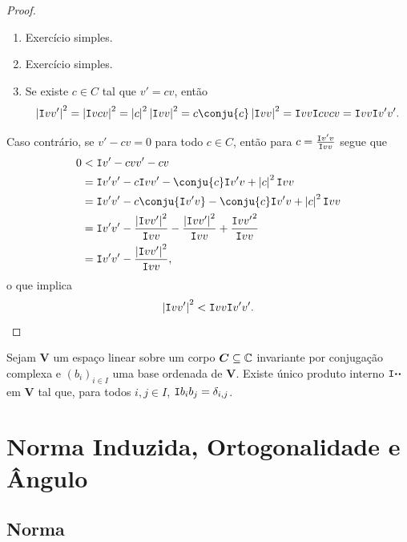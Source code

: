 \begin{proof}
	\begin{enumerate}
	\item Exercício simples.
	\item Exercício simples.
	\item Se existe $c \in C$ tal que $v'=cv$, então
		\begin{equation*}
		\abs{\inte{v}{v'}}^2 =\abs{\inte{v}{cv}}^2 = \abs{c}^2\abs{\inte{v}{v}}^2 = c\conju{c}\abs{\inte{v}{v}}^2 = \inte{v}{v}\inte{cv}{cv} = \inte{v}{v}\inte{v'}{v'}.
		\end{equation*}
	\end{enumerate}

Caso contrário, se $v'-cv=0$ para todo $c \in C$, então para $c=\frac{\mathtt I{v'}{v}}{\mathtt I{v}{v}}$ segue que
	\begin{align*}
	0 &< \inte{v'-cv}{v'-cv} \\
		&= \inte{v'}{v'} - c\inte{v}{v'} - \conju{c}\inte{v'}{v} + \abs{c}^2\inte{v}{v} \\
		&= \inte{v'}{v'} - c\conju{\inte{v'}{v}} - \conju{c}\inte{v'}{v} + \abs{c}^2\inte{v}{v} \\
		&= \inte{v'}{v'} - \frac{\abs{\inte{v}{v'}}^2}{\inte{v}{v}} - \frac{\abs{\inte{v}{v'}}^2}{\inte{v}{v}} + \frac{\inte{v}{v'}^2}{\inte{v}{v}} \\
		&=  \inte{v'}{v'} - \frac{\abs{\inte{v}{v'}}^2}{\inte{v}{v}},
	\end{align*}
o que implica
	\begin{equation*}
	\left\vert{\mathtt I{v}{v'}}\right\vert^2 < \mathtt I{v}{v}\mathtt I{v'}{v'}.
	\end{equation*}
\end{proof}

\begin{prop}
Sejam $\bm V$ um espaço linear sobre um corpo $\bm C \subseteq \mathbb{C}$ invariante por conjugação complexa e $(b_i)_{i \in I}$ uma base ordenada de $\bm V$. Existe único produto interno $\mathtt I{\bm{\cdot}}{\bm{\cdot}}$ em $\bm V$ tal que, para todos $i,j \in I$, $\mathtt I{b_i}{b_j}=\delta_{i,j}$.
\end{prop}

\section{Norma Induzida, Ortogonalidade e Ângulo}

\subsection{Norma}

